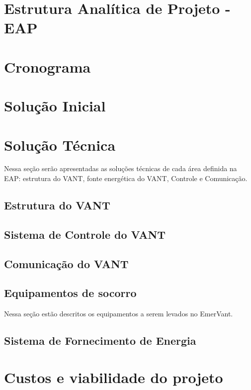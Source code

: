 \section{Estrutura Analítica de Projeto - EAP}
  
 
\pagebreak
\section{Cronograma}
  

\section{Solução Inicial}
  

\section{Solução Técnica}
  Nessa seção serão apresentadas as soluções técnicas de cada área definida na EAP: estrutura do VANT,
  fonte energética do VANT, Controle e Comunicação.

\subsection{Estrutura do VANT}
  
  
\subsection{Sistema de Controle do VANT}
  

\subsection{Comunicação do VANT}
  

\subsection{Equipamentos de socorro}
  Nessa seção estão descritos os equipamentos a serem levados no EmerVant.
  
  


\subsection{Sistema de Fornecimento de Energia}
  
\section{Custos e viabilidade do projeto}
  



